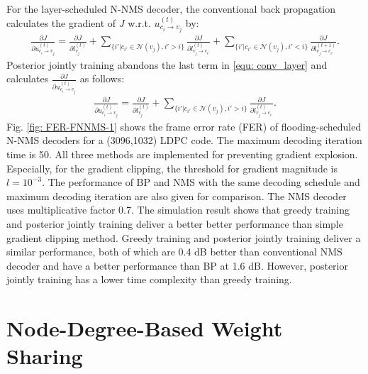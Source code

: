 \documentclass [PhD] {uclathes}
\begin{document}
For the layer-scheduled N-NMS decoder, the conventional back propagation calculates the gradient of $J$ w.r.t.  $ u^{(t)}_{c_i \rightarrow v_j}$ by:
\begin{align}\label{equ: conv_layer}
    \frac{\partial J}{\partial u^{(t)}_{c_i \rightarrow v_j}} =  \frac{\partial J}{\partial l^{(t)}_{v_j}}+ \sum_{\{i'|c_{i'}\in\mathcal{N}(v_j),i'>i\}}\frac{\partial J}{\partial l^{(t)}_{v_j \rightarrow c_{i'}}}+\sum_{\{i'|c_{i'}\in\mathcal{N}(v_j),i'<i\}}\frac{\partial J}{\partial l^{(t+1)}_{v_j \rightarrow c_{i'}}}.
\end{align}
Posterior jointly training abandons the last term in \eqref{equ: conv_layer} and calculates $\frac{\partial J}{\partial u^{(t)}_{c_i\rightarrow v_j}}$ as follows:
\begin{align}\label{equ: pt_layer}
    \frac{\partial J}{\partial u^{(t)}_{c_i \rightarrow v_j}} =  \frac{\partial J}{\partial l^{(t)}_{v_j}}+ \sum_{\{i'|c_{i'}\in\mathcal{N}(v_j),i'>i\}}\frac{\partial J}{\partial l^{(t)}_{v_j \rightarrow c_{i'}}}.
\end{align}
Fig. \ref{fig: FER-FNNMS-1} shows the frame error rate (FER) of flooding-scheduled N-NMS decoders for a (3096,1032) LDPC code. The maximum decoding iteration time is 50. All three methods are implemented for preventing gradient explosion. Especially, for the gradient clipping,  the threshold for gradient magnitude is $l=10^{-3}$. The performance of BP and NMS with the same decoding schedule and maximum decoding iteration are also given for comparison. The NMS decoder uses multiplicative factor 0.7. The simulation result shows that greedy training and posterior jointly training deliver a better better performance than simple gradient clipping method. Greedy training and posterior jointly training deliver a  similar performance, both of which are 0.4 dB better than conventional  NMS decoder and have a better performance than BP at 1.6 dB. However,  posterior jointly training has a lower time complexity than greedy training.

\section{Node-Degree-Based Weight Sharing}\label{sec: N-2D-NMS}
\end{document}
